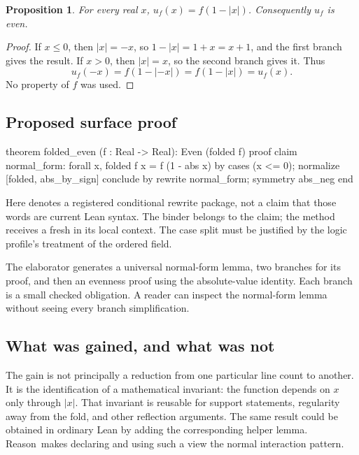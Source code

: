 \documentclass[11pt,a4paper]{article}
\newcommand{\Reason}{\textsf{Reason}}
\newcommand{\code}[1]{\texttt{\detokenize{#1}}}
\newtheorem{proposition}[theorem]{Proposition}
\theoremstyle{remark}
\begin{document}
\begin{proposition}\label{prop:fold}
For every real \(x\), \(u_f(x)=f(1-|x|)\). Consequently \(u_f\) is even.
\end{proposition}
\begin{proof}
If \(x\le0\), then \(|x|=-x\), so \(1-|x|=1+x=x+1\), and the first branch gives the result. If \(x>0\), then \(|x|=x\), so the second branch gives it. Thus
\[
 u_f(-x)=f(1-|-x|)=f(1-|x|)=u_f(x).
\]
No property of \(f\) was used.
\end{proof}

\subsection{Proposed surface proof}

\begin{Code}
theorem folded_even (f : Real -> Real): Even (folded f)
proof
  claim normal_form:
      forall x, folded f x = f (1 - abs x)
    by cases (x <= 0); normalize [folded, abs_by_sign]
  conclude by rewrite normal_form; symmetry abs_neg
end
\end{Code}
Here \code{abs_by_sign} denotes a registered conditional rewrite package, not a claim that those words are current Lean syntax. The \code{forall} binder belongs to the claim; the method receives a fresh \code{x} in its local context. The case split must be justified by the logic profile's treatment of the ordered field.

The elaborator generates a universal normal-form lemma, two branches for its proof, and then an evenness proof using the absolute-value identity. Each branch is a small checked obligation. A reader can inspect the normal-form lemma without seeing every branch simplification.

\subsection{What was gained, and what was not}

The gain is not principally a reduction from one particular line count to another. It is the identification of a mathematical invariant: the function depends on \(x\) only through \(|x|\). That invariant is reusable for support statements, regularity away from the fold, and other reflection arguments. The same result could be obtained in ordinary Lean by adding the corresponding helper lemma. \Reason\ makes declaring and using such a view the normal interaction pattern.
\end{document}
